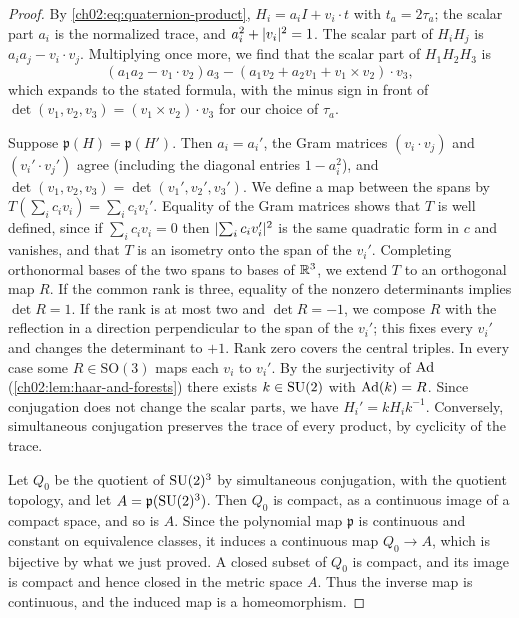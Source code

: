 \begin{proof}
By \eqref{ch02:eq:quaternion-product}, $H_i=a_iI+v_i\cdot t$ with $t_a=2\tau_a$; the scalar part $a_i$ is the normalized trace, and $a_i^2+\lvert v_i\rvert^2=1$. The scalar part of $H_iH_j$ is $a_ia_j-v_i\cdot v_j$. Multiplying once more, we find that the scalar part of $H_1H_2H_3$ is
\[
 (a_1a_2-v_1\cdot v_2)a_3-(a_1v_2+a_2v_1+v_1\times v_2)\cdot v_3,
\]
which expands to the stated formula, with the minus sign in front of $\det(v_1,v_2,v_3)=(v_1\times v_2)\cdot v_3$ for our choice of $\tau_a$.

Suppose $\mathfrak p(H)=\mathfrak p(H')$. Then $a_i=a_i'$, the Gram matrices $(v_i\cdot v_j)$ and $(v_i'\cdot v_j')$ agree (including the diagonal entries $1-a_i^2$), and $\det(v_1,v_2,v_3)=\det(v_1',v_2',v_3')$. We define a map between the spans by $T(\sum_ic_iv_i)=\sum_ic_iv_i'$. Equality of the Gram matrices shows that $T$ is well defined, since if $\sum_ic_iv_i=0$ then $\lvert \sum_ic_iv_i'\rvert^2$ is the same quadratic form in $c$ and vanishes, and that $T$ is an isometry onto the span of the $v_i'$. Completing orthonormal bases of the two spans to bases of $\mathbb R^3$, we extend $T$ to an orthogonal map $R$. If the common rank is three, equality of the nonzero determinants implies $\det R=1$. If the rank is at most two and $\det R=-1$, we compose $R$ with the reflection in a direction perpendicular to the span of the $v_i'$; this fixes every $v_i'$ and changes the determinant to $+1$. Rank zero covers the central triples. In every case some $R\in\mathrm{SO}(3)$ maps each $v_i$ to $v_i'$. By the surjectivity of $\operatorname{Ad}$ (\cref{ch02:lem:haar-and-forests}) there exists $k\in\mathrm{SU}(2)$ with $\operatorname{Ad}(k)=R$. Since conjugation does not change the scalar parts, we have $H_i'=kH_ik^{-1}$. Conversely, simultaneous conjugation preserves the trace of every product, by cyclicity of the trace.

Let $Q_0$ be the quotient of $\mathrm{SU}(2)^3$ by simultaneous conjugation, with the quotient topology, and let $A=\mathfrak p(\mathrm{SU}(2)^3)$. Then $Q_0$ is compact, as a continuous image of a compact space, and so is $A$. Since the polynomial map $\mathfrak p$ is continuous and constant on equivalence classes, it induces a continuous map $Q_0\to A$, which is bijective by what we just proved. A closed subset of $Q_0$ is compact, and its image is compact and hence closed in the metric space $A$. Thus the inverse map is continuous, and the induced map is a homeomorphism.


\end{proof}
